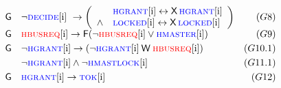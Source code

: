 \[{\begin{array}{llrlr}
& & \always & \neg \hdecidei\ \impl \left(
\begin{array}{ll}
       & \hgranti \leftrightarrow \nextt \hgranti \\
 \land & \hlockedi \leftrightarrow \nextt \hlockedi
\end{array}
\right) & (G8)\\[3pt]




& & \always & \hbusreqi \impl \eventually (\neg
\hbusreqi \lor \hmasteri) & (G9)\\[3pt]
& & \always & \neg \hgranti \impl (\neg \hgranti \weakuntil \hbusreqi) & (G10.1)\\[3pt]
& & & \neg \hgranti \land \neg \hmastlocki & (G11.1) \\[3pt]
& & \always & \hgranti \impl \toki & (G12)
\end{array}}\]
